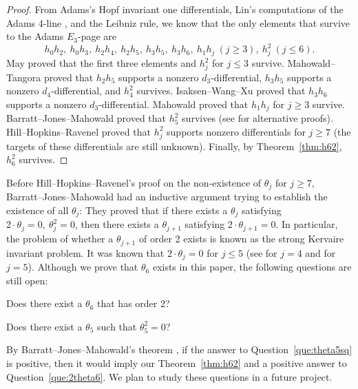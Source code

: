 \begin{proof}
    From Adams's Hopf invariant one differentials, Lin's computations of the Adams 4-line \cite{LinExt4}, and the Leibniz rule, we know that the only elements that survive to the Adams $E_3$-page are
    $$h_0h_2, \ h_0h_3, \ h_2h_4, \ h_2h_5, \ h_3h_5, \ h_3h_6, \ h_1h_j \ (j \geq 3), \ h_j^2 \ (j \leq 6).$$
May \cite{Maythesis} proved that the first three elements and $h_j^2$ for $j \leq 3$ survive. Mahowald--Tangora \cite{MahowaldTangora} proved that $h_2h_5$ supports a nonzero $d_3$-differential, $h_3h_5$ supports a nonzero $d_4$-differential, and $h_4^2$ survives. Isaksen--Wang--Xu \cite{IWX} proved that $h_3h_6$ supports a nonzero $d_3$-differential. Mahowald \cite{Mahowaldetaj} proved that $h_1h_j$ for $j \geq 3$ survive. Barratt--Jones--Mahowald \cite{BJMtheta5} proved that $h_5^2$ survives (see \cite{Xu, IWX} for alternative proofs). Hill--Hopkins--Ravenel \cite{HHR} proved that $h_j^2$ supports nonzero differentials for $j \geq 7$ (the targets of these differentials are still unknown). Finally, by Theorem~\ref{thm:h62}, $h_6^2$ survives.   
\end{proof}

Before Hill--Hopkins--Ravenel's proof on the non-existence of $\theta_j$ for $j \geq 7$, Barratt--Jones--Mahowald \cite{BJMinduction} had an inductive argument trying to establish the existence of all $\theta_j$: They proved that if there exists a $\theta_j$ satisfying $2\cdot \theta_j = 0, \ \theta_j^2 = 0$, then there exists a $\theta_{j+1}$ satisfying $2\cdot \theta_{j+1} = 0$. In particular, the problem of whether a $\theta_{j+1}$ of order 2 exists is known as the strong Kervaire invariant problem. It was known that $2\cdot \theta_j = 0$ for $j \leq 5$ (see \cite{MahowaldTangora} for $j=4$ and \cite{Xu, IWX} for $j=5$). Although we prove that $\theta_6$ exists in this paper, the following questions are still open:

\begin{question} \label{que:2theta6}
    Does there exist a $\theta_6$ that has order 2?
\end{question}

\begin{question} \label{que:theta5sq}
    Does there exist a $\theta_5$ such that $\theta_5^2 = 0$?
\end{question}

By Barratt--Jones--Mahowald's theorem \cite{BJMinduction}, if the answer to Question~\ref{que:theta5sq} is positive, then it would imply our Theorem~\ref{thm:h62} and a positive answer to Question~\ref{que:2theta6}. We plan to study these questions in a future project.\\

